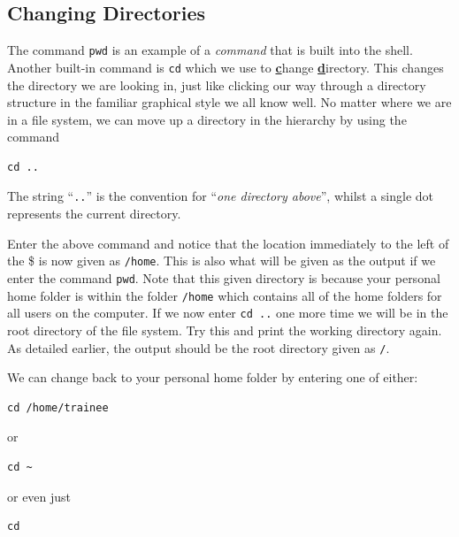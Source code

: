 \subsection{Changing Directories}
\begin{information}
The command \texttt{pwd} is an example of a \textit{command} that is built into the shell.
Another built-in command is \texttt{cd} which we use to \textbf{\underline{c}}hange \textbf{\underline{d}}irectory.
This changes the directory we are looking in, just like clicking our way through a directory structure in the familiar graphical style we all know well.
No matter where we are in a file system, we can move up a directory in the hierarchy by using the command 
\begin{lstlisting}
cd ..
\end{lstlisting}
The string ``\texttt{..}'' is the convention for ``\textit{one directory above}'', whilst a single dot represents the current directory. \\
\end{information}

\begin{steps}
Enter the above command and notice that the location immediately to the left of the \$ is now given as \texttt{/home}.
This is also what will be given as the output if we enter the command \texttt{pwd}.
Note that this given directory is because your personal home folder is within the folder \texttt{/home} which contains all of the home folders for all users on the computer.
If we now enter \texttt{cd ..} one more time we will be in the root directory of the file system.
Try this and print the working directory again.
As detailed earlier, the output should be the root directory given as \texttt{/}. \\
\end{steps}

We can change back to your personal home folder by entering one of either:
\begin{steps}
\begin{lstlisting}
cd /home/trainee
\end{lstlisting}
or \\
\begin{lstlisting}
cd ~ 
\end{lstlisting}
or even just \\
\begin{lstlisting}
cd
\end{lstlisting}
\end{steps}

